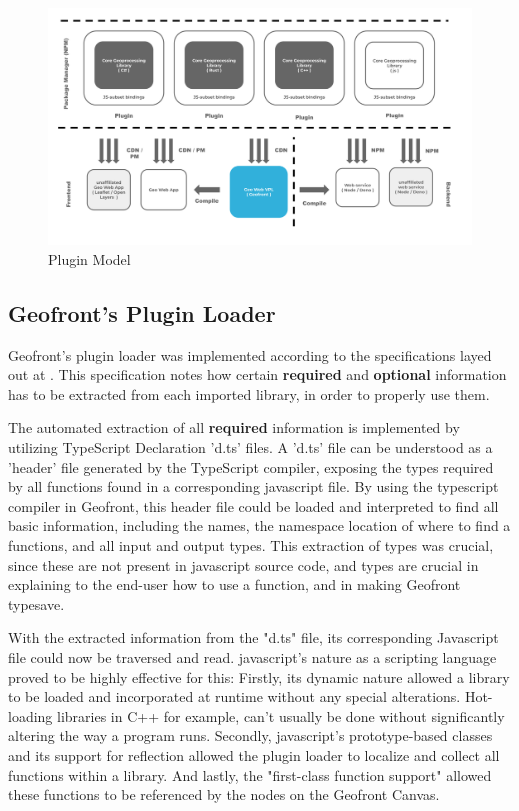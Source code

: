 \begin{figure}
  \centering
  \graphicspath{ {../../assets/diagrams/} }
  \includegraphics[width=\linewidth]{Model Proposal.png}
  \caption{Plugin Model}
  \label{fig:plugin-model}
\end{figure}

\subsection{Geofront's Plugin Loader}

Geofront's plugin loader was implemented according to the specifications layed out at .
This specification notes how certain \textbf{required} and \textbf{optional} information has to be extracted from each imported library, in order to properly use them. 

The automated extraction of all \textbf{required} information is implemented by utilizing TypeScript Declaration 'd.ts' files. 
A 'd.ts' file can be understood as a 'header' file generated by the TypeScript compiler, exposing the types required by all functions found in a corresponding javascript file.
By using the typescript compiler in Geofront, this header file could be loaded and interpreted to find all basic information, including the names, the namespace location of where to find a functions, and all input and output types.
This extraction of types was crucial, since these are not present in javascript source code, and types are crucial in explaining to the end-user how to use a function, and in making Geofront typesave.

With the extracted information from the "d.ts" file, its corresponding Javascript file could now be traversed and read.
javascript's nature as a scripting language proved to be highly effective for this:
Firstly, its dynamic nature allowed a library to be loaded and incorporated at runtime without any special alterations. 
Hot-loading libraries in C++ for example, can't usually be done without significantly altering the way a program runs. 
Secondly, javascript's prototype-based classes and its support for reflection allowed the plugin loader to localize and collect all functions within a library.
And lastly, the "first-class function support" allowed these functions to be referenced by the nodes on the Geofront Canvas. 

